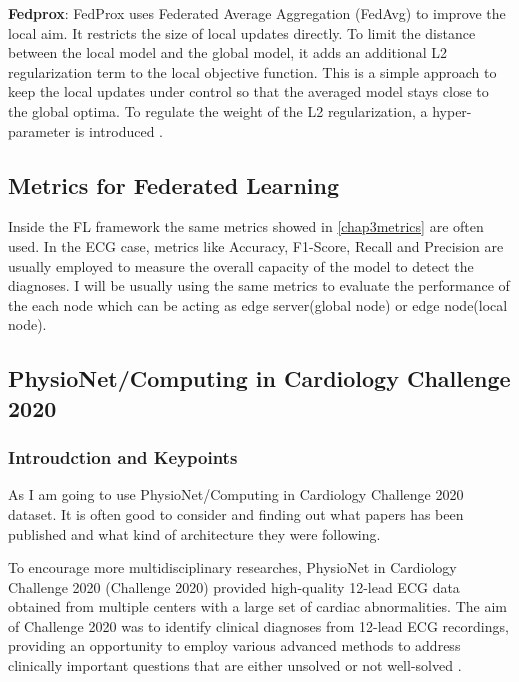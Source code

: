 \textbf{Fedprox}: FedProx uses Federated Average Aggregation (FedAvg) to improve the local aim. It restricts the size of local updates directly. To limit the distance between the local model and the global model, it adds an additional L2 regularization term to the local objective function. This is a simple approach to keep the local updates under control so that the averaged model stays close to the global optima. To regulate the weight of the L2 regularization, a hyper-parameter is introduced \cite{fl19}.

\subsection{Metrics for Federated Learning}

Inside the FL framework the same metrics showed in \ref{chap3metrics} are often used. In the ECG case, metrics like Accuracy, F1-Score, Recall and Precision are usually employed to measure the overall capacity of the model to detect the diagnoses. I will be usually using the same metrics to evaluate the performance of the each node which can be acting as edge server(global node) or edge node(local node). 


\subsection{PhysioNet/Computing in Cardiology Challenge 2020}

\subsubsection{Introudction and Keypoints}

As I am going to use \cite{physionet_challenge_2020} PhysioNet/Computing in Cardiology Challenge 2020 dataset. It is often good to consider and finding out what papers has been published and what kind of architecture they were following. 

\cite{main_arythmia_detection}To encourage more multidisciplinary researches, PhysioNet in Cardiology Challenge 2020 (Challenge 2020) \cite{physionet_challenge_2020} provided high-quality 12-lead ECG data obtained from multiple centers with a large set of cardiac abnormalities. The aim of Challenge 2020 was to identify clinical diagnoses from 12-lead ECG recordings, providing an opportunity to employ various advanced methods to address clinically important questions that are either unsolved or not well-solved \cite{arythmia_detection_9}.

